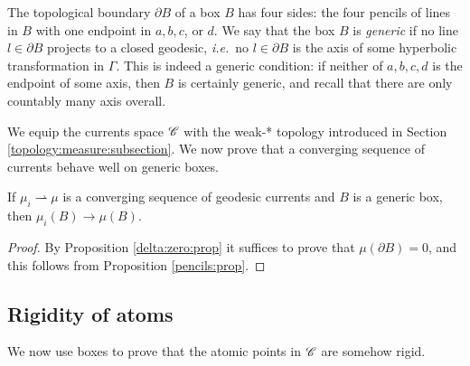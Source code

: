 The topological boundary $\partial B$ of a box $B$ has four sides: the four pencils of lines in $B$ with one endpoint in $a,b,c$, or $d$. We say that the box $B$ is \emph{generic} if no line $l\in\partial B$ projects to a closed geodesic, \emph{i.e.}~no $l\in\partial B$ is the axis of some hyperbolic transformation in $\Gamma$. This is indeed a generic condition: if neither of $a,b,c,d$ is the endpoint of some axis, then $B$ is certainly generic, and recall that there are only countably many axis overall.

We equip the currents space $\mathscr{C}$ with the weak-* topology introduced in Section \ref{topology:measure:subsection}. We now prove that a converging sequence of currents behave well on generic boxes.

\begin{prop}
If $\mu_i \rightharpoonup \mu$ is a converging sequence of geodesic currents and $B$ is a generic box, then $\mu_i(B) \to \mu(B)$.
\end{prop}
\begin{proof}
By Proposition \ref{delta:zero:prop} it suffices to prove that $\mu(\partial B) = 0$, and this follows from Proposition \ref{pencils:prop}.
\end{proof}

\subsection{Rigidity of atoms}
We now use boxes to prove that the atomic points in $\mathscr{C}$ are somehow rigid. 

